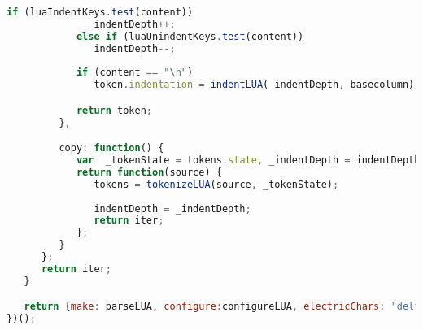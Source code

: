 \begin{lstlisting}[language=Javascript]
            if (luaIndentKeys.test(content))
               indentDepth++;
            else if (luaUnindentKeys.test(content))
               indentDepth--;
        
            if (content == "\n")
               token.indentation = indentLUA( indentDepth, basecolumn);

            return token;
         },

         copy: function() {
            var  _tokenState = tokens.state, _indentDepth = indentDepth;
            return function(source) {
               tokens = tokenizeLUA(source, _tokenState);
      
               indentDepth = _indentDepth;
               return iter;
            };
         }
      };
      return iter;
   }

   return {make: parseLUA, configure:configureLUA, electricChars: "delf})"};   //en[d] els[e] unti[l] elsei[f]  // this should be taken from Keys keywords
})();
\end{lstlisting}

